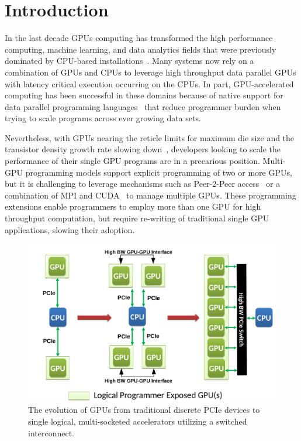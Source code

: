 \section{Introduction}
\label{introduction}

In the last decade GPUs computing has transformed the high performance 
computing, machine learning, and data analytics fields that were previously 
dominated by CPU-based 
installations~\cite{intersect360,cudnn,Lavin15b,SimonyanZ14a}. Many systems now 
rely on a combination of GPUs and CPUs to leverage high throughput data parallel 
GPUs with latency critical execution occurring on the CPUs. In part, 
GPU-accelerated computing has been successful in these domains because of native 
support for data parallel programming languages~\cite{CUDA7,OPENCL} that reduce 
programmer burden when trying to scale programs across ever growing data sets.

Nevertheless, with GPUs nearing the reticle limits for maximum die size and 
the transistor density growth rate slowing down~\cite{mooredead2016}, developers 
looking to scale the performance of their single GPU programs are in a 
precarious position. Multi-GPU programming models support explicit programming 
of two or more GPUs, but it is challenging to leverage mechanisms such as 
Peer-2-Peer access~\cite{NVIDIAP2P} or a combination of MPI and 
CUDA~\cite{NVIDIAMPI} to manage multiple GPUs. These programming extensions 
enable programmers to employ more than one GPU for high throughput computation, 
but require re-writing of traditional single GPU applications,
slowing their adoption.

\begin{figure}[t]
	\centering
	\includegraphics[width=1.0\columnwidth]{figures/inter_gpu_connections.pdf}
	\caption{The evolution of GPUs from traditional discrete PCIe devices to 
		single logical, multi-socketed accelerators utilizing a switched interconnect.}
	\label{fig:systemdiagram}
\end{figure}

